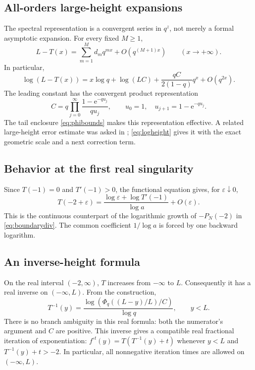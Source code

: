 \documentclass[11pt,letterpaper]{article}
\theoremstyle{definition}\newtheorem{definition}[theorem]{Definition}
\theoremstyle{remark}\newtheorem{remark}[theorem]{Remark}
\newcommand{\ee}{\mathrm e}
\newcommand{\PhiQ}{\Phi_q}
\numberwithin{equation}{section}
\begin{document}
\subsection{All-orders large-height expansions}
The spectral representation is a convergent series in $q^z$, not merely a formal asymptotic expansion. For every fixed $M\geq1$,
\begin{equation}\label{eq:heightasympt}
 L-T(x)=\sum_{m=1}^{M}d_mq^{mx}+O(q^{(M+1)x})
 \qquad(x\to+\infty).
\end{equation}
In particular,
\begin{equation}\label{eq:logheight}
 \log(L-T(x))=x\log q+\log(LC)
 +\frac{qC}{2(1-q)}q^x+O(q^{2x}).
\end{equation}
The leading constant has the convergent product representation
\begin{equation}\label{eq:Cproduct}
 C=q\prod_{j=0}^{\infty}\frac{1-\ee^{-qu_j}}{qu_j},
 \qquad u_0=1,\quad u_{j+1}=1-\ee^{-qu_j}.
\end{equation}
The tail enclosure \eqref{eq:phibounds} makes this representation effective. A related large-height error estimate was asked in \cite{MSE2014}; \eqref{eq:logheight} gives it with the exact geometric scale and a next correction term.

\subsection{Behavior at the first real singularity}
Since $T(-1)=0$ and $T'(-1)>0$, the functional equation gives, for $\varepsilon\downarrow0$,
\begin{equation}\label{eq:realboundary}
 T(-2+\varepsilon)
 =\frac{\log\varepsilon+\log T'(-1)}{\log a}+O(\varepsilon).
\end{equation}
This is the continuous counterpart of the logarithmic growth of $-P_N(-2)$ in \eqref{eq:boundarydiv}. The common coefficient $1/\log a$ is forced by one backward logarithm.

\subsection{An inverse-height formula}
On the real interval $(-2,\infty)$, $T$ increases from $-\infty$ to $L$. Consequently it has a real inverse on $(-\infty,L)$. From the construction,
\begin{equation}\label{eq:inverse}
 T^{-1}(y)=\frac{\log\left(\PhiQ((L-y)/L)/C\right)}{\log q},
 \qquad y<L.
\end{equation}
There is no branch ambiguity in this real formula: both the numerator's argument and $C$ are positive. This inverse gives a compatible real fractional iteration of exponentiation: $f^{\circ t}(y)=T(T^{-1}(y)+t)$ whenever $y<L$ and $T^{-1}(y)+t>-2$. In particular, all nonnegative iteration times are allowed on $(-\infty,L)$.
\end{document}
